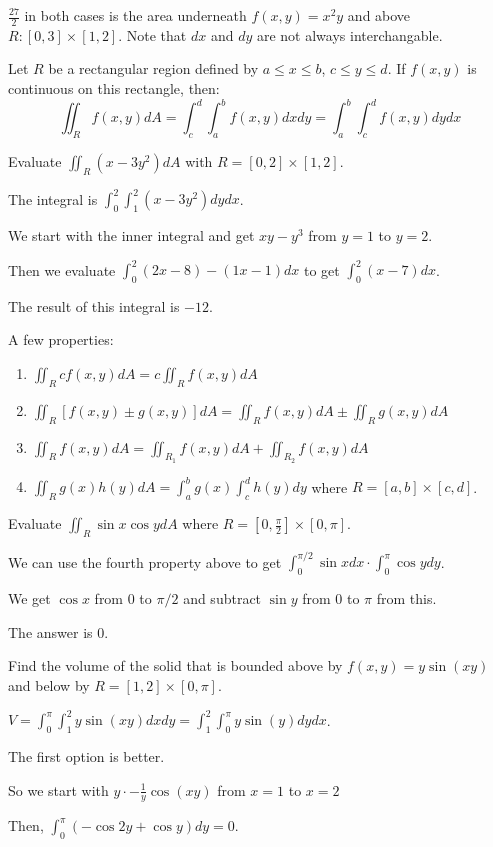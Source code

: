 \documentclass[../calc3.tex]{subfiles}
\begin{document}
$\frac{27}{2}$ in both cases is the area underneath $f(x,y)=x^2y$ and above $R:[0,3]\times [1,2]$. Note that $dx$ and $dy$ are not always interchangable.

\begin{theorem}
    Let $R$ be a rectangular region defined by $a\leq x\leq b$, $c\leq y\leq d$. If $f(x,y)$ is continuous on this rectangle, then:
    \[ \iint_R f(x,y)dA = \int_c^d \int_a^b f(x,y)dxdy = \int_a^b \int_c^d f(x,y)dydx \]
\end{theorem}

\begin{example}
    Evaluate $\iint_R (x-3y^2)dA$ with $R=[0,2]\times [1,2]$.

    The integral is $\int_0^2 \int_1^2 (x-3y^2)dydx$.

    We start with the inner integral and get $xy-y^3$ from $y=1$ to $y=2$.

    Then we evaluate $\int_0^2 (2x-8)-(1x-1)dx$ to get $\int_0^2 (x-7)dx$.

    The result of this integral is $-12$.
\end{example}

A few properties:
\begin{enumerate}
    \item $\iint_R cf(x,y)dA = c\iint_R f(x,y)dA$
    \item $\iint_R [f(x,y)\pm g(x,y)]dA = \iint_R f(x,y)dA \pm \iint_R g(x,y)dA$
    \item $\iint_R f(x,y)dA = \iint_{R_1}f(x,y)dA + \iint_{R_2}f(x,y)dA$
    \item $\iint_R g(x)h(y)dA = \int_a^b g(x)\int_c^d h(y)dy$ where $R=[a,b]\times [c,d]$.
\end{enumerate}

\begin{example}
    Evaluate $\iint_R \sin x\cos y dA$ where $R=\left[0,\frac{\pi}{2}\right]\times [0,\pi]$.

    We can use the fourth property above to get $\int_0^{\pi/2}\sin xdx\cdot \int_0^{\pi}\cos y dy$.

    We get $\cos x$ from $0$ to $\pi/2$ and subtract $\sin y$ from $0$ to $\pi$ from this.

    The answer is $0$.
\end{example}

\begin{example}
    Find the volume of the solid that is bounded above by $f(x,y)=y\sin(xy)$ and below by $R=[1,2]\times [0,\pi]$.

    $V=\int_0^{\pi}\int_1^2 y\sin(xy)dxdy=\int_1^2 \int_0^{\pi}y\sin(y)dydx$.

    The first option is better.

    So we start with $y\cdot -\frac{1}{y}\cos(xy)$ from $x=1$ to $x=2$ 

    Then, $\int_0^{\pi}(-\cos 2y+\cos y)dy = 0$.
\end{example}
\end{document}
